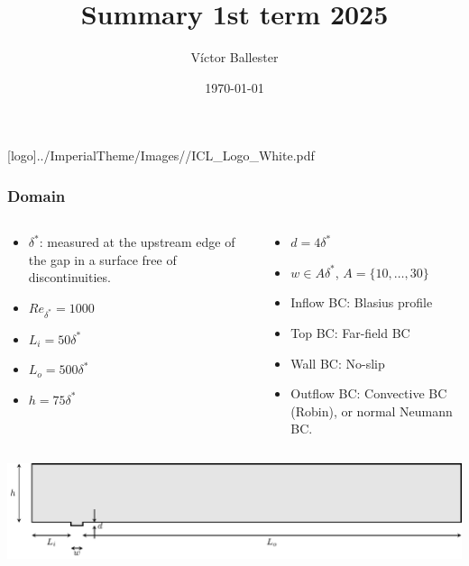 \documentclass[
  aspectratio=169, %
  t, %
  onlytextwidth, %
  10pt, %
]{beamer}
\title{Summary 1st term 2025} %
\subtitle{} %
\author{Víctor Ballester} %
\date{\today} %
\def\imagefolder{../ImperialTheme/Images/}
\begin{document}
\begingroup
{} %
[logo]{\imagefolder/ICL_Logo_White.pdf} %
\frame[plain, s]{\titlepage} %
\endgroup

\begin{frame}
  \frametitle{Domain}
  \begin{columns}[T] %
    \begin{column}{0.48\linewidth} %
      \begin{itemize}
	\item $\delta^*$: measured at the upstream edge of the gap in a surface free of discontinuities.
	\item $Re_{\delta^*} = 1000$
	\item $L_i = 50\delta^*$
	\item $L_o = 500\delta^*$
	\item $h = 75\delta^*$
      \end{itemize}
    \end{column}
    \begin{column}{0.48\linewidth} %
      \begin{itemize}
	\item $d = 4\delta^*$
	\item $w \in A\delta^*$, $A = \{10,\ldots,30\}$
	\item Inflow BC: Blasius profile
	\item Top BC: Far-field BC
	\item Wall BC: No-slip
	\item Outflow BC: Convective BC (Robin), or normal Neumann BC.
      \end{itemize}
    \end{column}
  \end{columns}
  {
  \centering
  \includegraphics[width=1\textwidth]{../../Images/domain.pdf}
  }
\end{frame}
\end{document}
